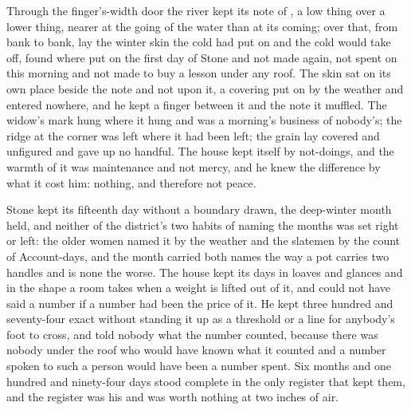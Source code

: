 Through the finger's-width door the river kept its note of , a low thing over a lower thing, nearer at the going of the water than at its coming; over that, from bank to bank, lay the winter skin the cold had put on and the cold would take off, found where put on the first day of Stone and not made again, not spent on this morning and not made to buy a lesson under any roof. The skin sat on its own place beside the note and not upon it, a covering put on by the weather and entered nowhere, and he kept a finger between it and the note it muffled. The widow's mark hung where it hung and was a morning's business of nobody's; the ridge at the corner was left where it had been left; the grain lay covered and unfigured and gave up no handful. The house kept itself by not-doings, and the warmth of it was maintenance and not mercy, and he knew the difference by what it cost him: nothing, and therefore not peace.

Stone kept its fifteenth day without a boundary drawn, the deep-winter month held, and neither of the district's two habits of naming the months was set right or left: the older women named it by the weather and the slatemen by the count of Account-days, and the month carried both names the way a pot carries two handles and is none the worse. The house kept its days in loaves and glances and in the shape a room takes when a weight is lifted out of it, and could not have said a number if a number had been the price of it. He kept three hundred and seventy-four exact without standing it up as a threshold or a line for anybody's foot to cross, and told nobody what the number counted, because there was nobody under the roof who would have known what it counted and a number spoken to such a person would have been a number spent. Six months and one hundred and ninety-four days stood complete in the only register that kept them, and the register was his and was worth nothing at two inches of air.

\scenebreak

